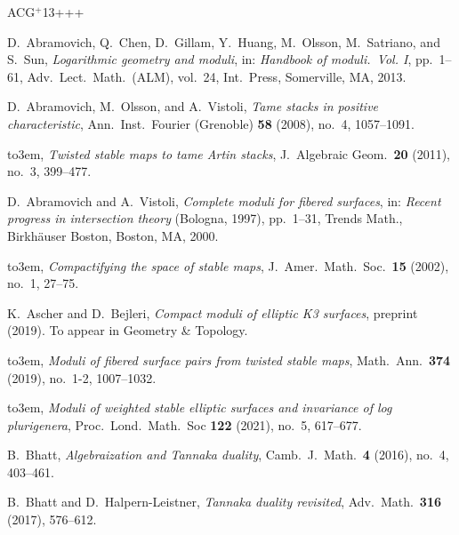 \documentclass[11pt]{amsart}
\numberwithin{equation}{section}
\theoremstyle{definition}
\theoremstyle{remark}
\begin{document}
\newcommand{\etalchar}[1]{$^{#1}$}
\providecommand{\bysame}{\leavevmode\hbox to3em{\hrulefill}\thinspace}
\providecommand{\MR}{\relax\ifhmode\unskip\space\fi MR }
\providecommand{\MRhref}[2]{%
  \href{http://www.ams.org/mathscinet-getitem?mr=#1}{#2}
}
\providecommand{\href}[2]{#2}
\begin{thebibliography}{ACG{\etalchar{+}}13+++}

\bibitem[ACG{\etalchar{+}}13]{HoM}
D.~Abramovich, Q.~Chen, D.~Gillam, Y.~Huang, M.~Olsson, M.~Satriano, and
  S.~Sun, \emph{Logarithmic geometry and moduli}, in: \emph{Handbook of moduli.\ {V}ol. {I}},  pp.~1--61, Adv.\ Lect.\ Math.\ (ALM), vol.~24, Int.\ Press, Somerville, MA, 2013.

D.~Abramovich, M.~Olsson, and A.~Vistoli, \emph{Tame stacks in positive
  characteristic}, Ann.\ Inst.\ Fourier (Grenoble) \textbf{58} (2008), no.~4,
1057--1091.

\bysame, \emph{Twisted stable maps to tame {A}rtin stacks}, J.\ Algebraic Geom.\
\textbf{20} (2011), no.~3, 399--477.

D.~Abramovich and A.~Vistoli, \emph{Complete moduli for fibered surfaces}, in: 
  \emph{Recent progress in intersection theory} ({B}ologna, 1997), pp.~1--31, Trends Math.,  Birkh\"{a}user Boston, Boston, MA, 2000.

\bysame, \emph{Compactifying the space of stable maps}, J.\ Amer.\ Math.\ Soc.\
\textbf{15} (2002), no.~1, 27--75.

K.~Ascher and D.~Bejleri, \emph{Compact moduli of elliptic {K}3 surfaces}, 
 preprint  (2019). To appear in Geometry \& Topology. 

\bibitem[AB19b]{tsm}
\bysame, \emph{Moduli of fibered surface pairs from twisted
  stable maps}, Math.\ Ann.\ \textbf{374} (2019), no.~1-2, 1007--1032.

\bibitem[AB21]{master}
\bysame, \emph{Moduli of weighted stable elliptic surfaces and
  invariance of log plurigenera}, Proc.\ Lond.\ Math.\ Soc \textbf{122} (2021),
  no.~5, 617--677.


B.~Bhatt, \emph{Algebraization and {T}annaka duality}, Camb.\ J.\ Math.\
  \textbf{4} (2016), no.~4, 403--461.

\bibitem[BHL17]{BDHL}
B.~Bhatt and D.~Halpern-Leistner, \emph{Tannaka duality revisited}, Adv.\ Math.\
  \textbf{316} (2017), 576--612.


\end{thebibliography}
\end{document}
